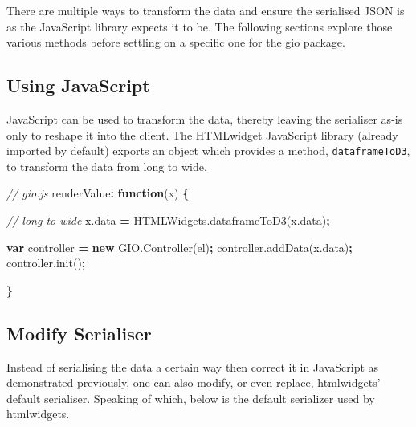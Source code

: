 \documentclass[10pt,]{krantz}
\makeatletter
\newenvironment{Shaded}{\begin{snugshade}}{\end{snugshade}}
\newcommand{\AttributeTok}[1]{\textcolor[rgb]{0.61,0.61,0.61}{#1}}
\newcommand{\CommentTok}[1]{\textcolor[rgb]{0.37,0.37,0.37}{\textit{#1}}}
\newcommand{\KeywordTok}[1]{\textcolor[rgb]{0.27,0.27,0.27}{\textbf{#1}}}
\newcommand{\NormalTok}[1]{#1}
\newcommand{\OperatorTok}[1]{\textcolor[rgb]{0.43,0.43,0.43}{\textbf{#1}}}
\newcommand{\VariableTok}[1]{\textcolor[rgb]{0,0,0}{#1}}
\newenvironment{kframe}{%
\medskip{}
\setlength{\fboxsep}{.8em}
 \def\at@end@of@kframe{}%
 \ifinner\ifhmode%
  \def\at@end@of@kframe{\end{minipage}}%
  \begin{minipage}{\columnwidth}%
 \fi\fi%
 \def\FrameCommand##1{\hskip\@totalleftmargin \hskip-\fboxsep
 \colorbox{shadecolor}{##1}\hskip-\fboxsep
     \hskip-\linewidth \hskip-\@totalleftmargin \hskip\columnwidth}%
 \MakeFramed {\advance\hsize-\width
   \@totalleftmargin\z@ \linewidth\hsize
   \@setminipage}}%
 {\par\unskip\endMakeFramed%
 \at@end@of@kframe}
\renewenvironment{Shaded}{\begin{kframe}}{\end{kframe}}
\makeatother
\begin{document}
There are multiple ways to transform the data and ensure the serialised JSON is as the JavaScript library expects it to be. The following sections explore those various methods before settling on a specific one for the gio package.

\hypertarget{widgets-full-transform-data-js}{%
\subsection{Using JavaScript}\label{widgets-full-transform-data-js}}

JavaScript can be used to transform the data, thereby leaving the serialiser as-is only to reshape it into the client. The HTMLwidget JavaScript library (already imported by default) exports an object which provides a method, \texttt{dataframeToD3}, to transform the data from long to wide.

\begin{Shaded}
\begin{Highlighting}[]
\CommentTok{// gio.js}
\NormalTok{renderValue}\OperatorTok{:} \KeywordTok{function}\NormalTok{(x) }\OperatorTok{\{}

  \CommentTok{// long to wide}
  \VariableTok{x}\NormalTok{.}\AttributeTok{data} \OperatorTok{=} \VariableTok{HTMLWidgets}\NormalTok{.}\AttributeTok{dataframeToD3}\NormalTok{(}\VariableTok{x}\NormalTok{.}\AttributeTok{data}\NormalTok{)}\OperatorTok{;}

  \KeywordTok{var}\NormalTok{ controller }\OperatorTok{=} \KeywordTok{new} \VariableTok{GIO}\NormalTok{.}\AttributeTok{Controller}\NormalTok{(el)}\OperatorTok{;}
  \VariableTok{controller}\NormalTok{.}\AttributeTok{addData}\NormalTok{(}\VariableTok{x}\NormalTok{.}\AttributeTok{data}\NormalTok{)}\OperatorTok{;} 
  \VariableTok{controller}\NormalTok{.}\AttributeTok{init}\NormalTok{()}\OperatorTok{;}

\OperatorTok{\}}
\end{Highlighting}
\end{Shaded}

\hypertarget{widgets-full-transform-data-modify}{%
\subsection{Modify Serialiser}\label{widgets-full-transform-data-modify}}

Instead of serialising the data a certain way then correct it in JavaScript as demonstrated previously, one can also modify, or even replace, htmlwidgets' default serialiser. Speaking of which, below is the default serializer used by htmlwidgets.
\end{document}
